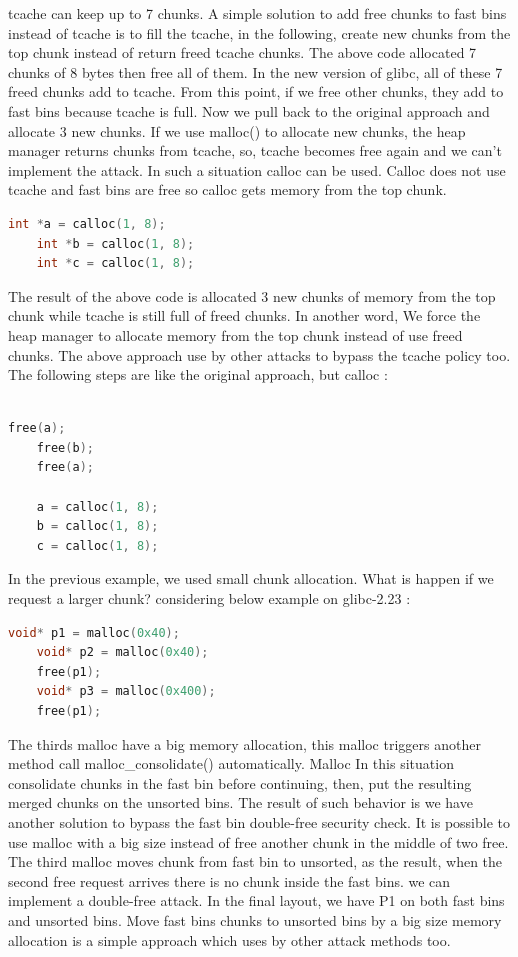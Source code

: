\documentclass{masterthesis}
\newcommand*\libc{glibc}
\newcommand*\tch{tcache}
\newcommand*\fb{fast bins}
\newcommand*\ub{unsorted bins}
\begin{document}
\tch{} can keep up to 7 chunks. A simple solution to add free chunks to \fb{} instead of \tch{} is to fill the \tch{}, in the following, create new chunks from the top chunk instead of return freed \tch{} chunks. The above code allocated 7 chunks of 8 bytes then free all of them. In the new version of \libc{}, all of these 7 freed chunks add to \tch{}. From this point, if we free other chunks, they add to \fb{} because \tch{} is full. Now we pull back to the original approach and allocate 3 new chunks. If we use malloc() to allocate new chunks, the heap manager returns chunks from \tch{}, so, \tch{} becomes free again and we can’t implement the attack. In such a situation calloc can be used. Calloc does not use \tch{} and \fb{} are free so calloc gets memory from the top chunk. 

\begin{lstlisting}[language=c,frame=tlrb]
	int *a = calloc(1, 8);
	int *b = calloc(1, 8);
	int *c = calloc(1, 8);
\end{lstlisting}

The result of the above code is allocated 3 new chunks of memory from the top chunk while \tch{} is still full of freed chunks. In another word, We force the heap manager to allocate memory from the top chunk instead of use freed chunks. The above approach use by other attacks to bypass the \tch{} policy too. The following steps are like the original approach, but calloc :

\begin{lstlisting}[language=c,frame=tlrb]

free(a);
	free(b);
	free(a);

	a = calloc(1, 8);
	b = calloc(1, 8);
	c = calloc(1, 8);
\end{lstlisting}

In the previous example, we used small chunk allocation. What is happen if we request a larger chunk? considering below example on \libc{-2.23} :

\begin{lstlisting}[language=c,frame=tlrb]
 	void* p1 = malloc(0x40);
	void* p2 = malloc(0x40);
 	free(p1);
	void* p3 = malloc(0x400);
	free(p1);
\end{lstlisting}

The thirds malloc have a big memory allocation, this malloc triggers another method call malloc\_consolidate() automatically. Malloc In this situation consolidate chunks in the fast bin before continuing, then, put the resulting merged chunks on the \ub{}.
The result of such behavior is we have another solution to bypass the fast bin double-free security check. It is possible to use malloc with a big size instead of free another chunk in the middle of two free. The third malloc moves chunk from fast bin to unsorted, as the result, when the second free request arrives there is no chunk inside the \fb{}. we can implement a double-free attack. In the final layout, we have P1 on both \fb{} and \ub{}. Move \fb{} chunks to \ub{} by a big size memory allocation is a simple approach which uses by other attack methods too.
\end{document}
